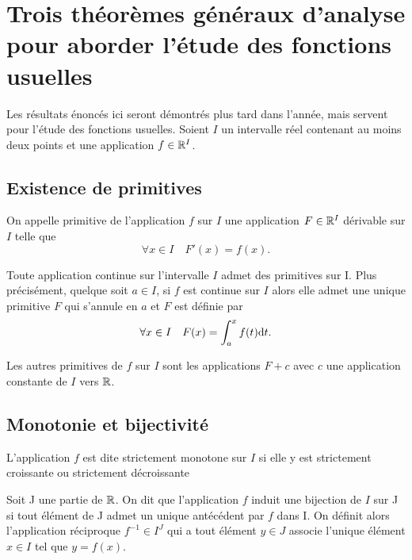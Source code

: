 \chapter{Trois théorèmes généraux d'analyse pour aborder l'étude des fonctions 
usuelles}\label{chap:theogen}

Les résultats énoncés ici seront démontrés plus tard dans l'année, mais servent 
pour l'étude des fonctions usuelles. Soient \(I\) un intervalle réel contenant 
au moins deux points et une application \(f \in \mathbb{R}^I\).

\section{Existence de primitives}

\begin{defdef}
  On appelle primitive de l'application \(f\) sur \(I\) une application \(F \in 
  \mathbb{R}^I\) dérivable sur \(I\) telle que
  \begin{equation}
    \forall x \in I \quad F'(x)=f(x).
  \end{equation}
\end{defdef}
\begin{theo}
  Toute application continue sur l'intervalle \(I\) admet des primitives sur I. 
  Plus précisément, quelque soit \(a \in I\), si \(f\) est continue sur \(I\) 
  alors elle admet une unique primitive \(F\) qui s'annule en \(a\) et \(F\) est 
  définie par
  \begin{equation}
    \forall x \in I \quad F(x)=\int_{a}^x f(t) \mathrm{d} t.
  \end{equation}
\end{theo}
Les autres primitives de \(f\) sur \(I\) sont les applications \(F+c\) avec 
\(c\) une application constante de \(I\) vers \(\mathbb{R}\).

\section{Monotonie et bijectivité}

\begin{defdef}
  L'application \(f\) est dite strictement monotone sur \(I\) si elle y est 
  strictement croissante ou strictement décroissante
\end{defdef}

\begin{defdef}
  Soit J une partie de \(\mathbb{R}\). On dit que l'application \(f\) induit une 
  bijection de \(I\) sur J si tout élément de J admet un unique antécédent par 
  \(f\) dans I. On définit alors l'application réciproque \(f^{-1} \in I^J\) qui 
  a tout élément \(y \in J\) associe l'unique élément \(x \in I\) tel que 
  \(y=f(x)\).
\end{defdef}

